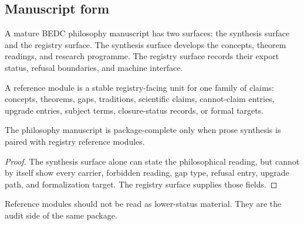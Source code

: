 \subsection{Manuscript form}
\label{subsec:philosophy-manuscript-form}

\begin{definition}
\label{def:philosophy-two-surface-manuscript}
A mature BEDC philosophy manuscript has two surfaces: the synthesis
surface and the registry surface. The synthesis surface develops the
concepts, theorem readings, and research programme. The registry
surface records their export status, refusal boundaries, and machine
interface.
\end{definition}

\begin{definition}
\label{def:philosophy-reference-module}
A reference module is a stable registry-facing unit for one family of
claims: concepts, theorems, gaps, traditions, scientific claims,
cannot-claim entries, upgrade entries, subject terms, closure-status
records, or formal targets.
\end{definition}

\begin{theorem}
\label{thm:philosophy-manuscript-completion-two-surfaces}
The philosophy manuscript is package-complete only when prose synthesis
is paired with registry reference modules.
\end{theorem}
\begin{proof}
The synthesis surface alone can state the philosophical reading, but
cannot by itself show every carrier, forbidden reading, gap type,
refusal entry, upgrade path, and formalization target. The registry
surface supplies those fields.
\end{proof}

\begin{corollary}
\label{cor:philosophy-reference-modules-not-lower-status}
Reference modules should not be read as lower-status material. They
are the audit side of the same package.
\end{corollary}
